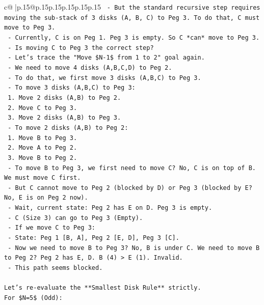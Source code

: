 \documentclass{article}
\begin{document}
{\begin{supertabular}{c@{$\;$}|p{.15\linewidth}@{}p{.15\linewidth}p{.15\linewidth}p{.15\linewidth}p{.15\linewidth}p{.15\linewidth}}
{{{\texttt{    {-} But the standard recursive step requires moving the sub{-}stack of 3 disks (A, B, C) to Peg 3. To do that, C must move to Peg 3.} \\
\texttt{    {-} Currently, C is on Peg 1. Peg 3 is empty. So C *can* move to Peg 3.} \\
\texttt{    {-} Is moving C to Peg 3 the correct step?} \\
\texttt{    {-} Let's trace the "Move \$N{-}1\$ from 1 to 2" goal again.} \\
\texttt{    {-} We need to move 4 disks (A,B,C,D) to Peg 2.} \\
\texttt{    {-} To do that, we first move 3 disks (A,B,C) to Peg 3.} \\
\texttt{    {-} To move 3 disks (A,B,C) to Peg 3:} \\
\texttt{        1. Move 2 disks (A,B) to Peg 2.} \\
\texttt{        2. Move C to Peg 3.} \\
\texttt{        3. Move 2 disks (A,B) to Peg 3.} \\
\texttt{    {-} To move 2 disks (A,B) to Peg 2:} \\
\texttt{        1. Move B to Peg 3.} \\
\texttt{        2. Move A to Peg 2.} \\
\texttt{        3. Move B to Peg 2.} \\
\texttt{    {-} To move B to Peg 3, we first need to move C? No, C is on top of B. We must move C first.} \\
\texttt{    {-} But C cannot move to Peg 2 (blocked by D) or Peg 3 (blocked by E? No, E is on Peg 2 now).} \\
\texttt{    {-} Wait, current state: Peg 2 has E on D. Peg 3 is empty.} \\
\texttt{    {-} C (Size 3) can go to Peg 3 (Empty).} \\
\texttt{    {-} If we move C to Peg 3:} \\
\texttt{        {-} State: Peg 1 {[}B, A{]}, Peg 2 {[}E, D{]}, Peg 3 {[}C{]}.} \\
\texttt{        {-} Now we need to move B to Peg 3? No, B is under C. We need to move B to Peg 2? Peg 2 has E, D. B (4) > E (1). Invalid.} \\
\texttt{        {-} This path seems blocked.} \\
\\ 
\texttt{Let's re{-}evaluate the **Smallest Disk Rule** strictly.} \\
\texttt{For \$N=5\$ (Odd):} \\
}}}
\end{supertabular}}
\end{document}
